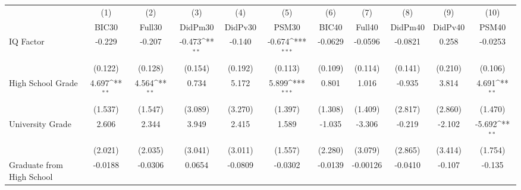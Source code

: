 {
\def\sym#1{\ifmmode^{#1}\else\(^{#1}\)\fi}
\begin{tabular}{l*{10}{c}}
\toprule
            &\multicolumn{1}{c}{(1)}&\multicolumn{1}{c}{(2)}&\multicolumn{1}{c}{(3)}&\multicolumn{1}{c}{(4)}&\multicolumn{1}{c}{(5)}&\multicolumn{1}{c}{(6)}&\multicolumn{1}{c}{(7)}&\multicolumn{1}{c}{(8)}&\multicolumn{1}{c}{(9)}&\multicolumn{1}{c}{(10)}\\
            &\multicolumn{1}{c}{BIC30}&\multicolumn{1}{c}{Full30}&\multicolumn{1}{c}{DidPm30}&\multicolumn{1}{c}{DidPv30}&\multicolumn{1}{c}{PSM30}&\multicolumn{1}{c}{BIC40}&\multicolumn{1}{c}{Full40}&\multicolumn{1}{c}{DidPm40}&\multicolumn{1}{c}{DidPv40}&\multicolumn{1}{c}{PSM40}\\
\midrule
IQ Factor   &      -0.229         &      -0.207         &      -0.473\sym{**} &      -0.140         &      -0.674\sym{***}&     -0.0629         &     -0.0596         &     -0.0821         &       0.258         &     -0.0253         \\
            &     (0.122)         &     (0.128)         &     (0.154)         &     (0.192)         &     (0.113)         &     (0.109)         &     (0.114)         &     (0.141)         &     (0.210)         &     (0.106)         \\
\addlinespace
High School Grade&       4.697\sym{**} &       4.564\sym{**} &       0.734         &       5.172         &       5.899\sym{***}&       0.801         &       1.016         &      -0.935         &       3.814         &       4.691\sym{**} \\
            &     (1.537)         &     (1.547)         &     (3.089)         &     (3.270)         &     (1.397)         &     (1.308)         &     (1.409)         &     (2.817)         &     (2.860)         &     (1.470)         \\
\addlinespace
University Grade&       2.606         &       2.344         &       3.949         &       2.415         &       1.589         &      -1.035         &      -3.306         &      -0.219         &      -2.102         &      -5.692\sym{**} \\
            &     (2.021)         &     (2.035)         &     (3.041)         &     (3.011)         &     (1.557)         &     (2.280)         &     (3.079)         &     (2.865)         &     (3.414)         &     (1.754)         \\
\addlinespace
Graduate from High School&     -0.0188         &     -0.0306         &      0.0654         &     -0.0809         &     -0.0302         &     -0.0139         &    -0.00126         &     -0.0410         &      -0.107         &      -0.135         \\

\end{tabular}}
